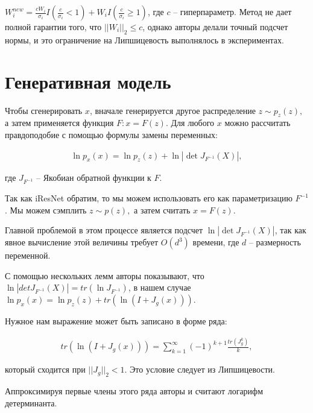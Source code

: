 \documentclass{article}
\begin{document}
$W_i^{new} = \frac{cW_i}{\sigma_i} I(\frac{c}{\sigma_i}<1) + W_i I(\frac{c}{\sigma_i}\geq1)$, где $c$ -- гиперпараметр. Метод не дает полной гарантии того, что $||W_i||_2 \leq c$, однако авторы делали точный подсчет нормы, и это ограничение на Липшицевость выполнялось в экспериментах. 

\section{Генеративная модель}

Чтобы сгенерировать $x$, вначале генерируется другое распределение $z \sim p_z(z),$ а затем применяется функция $F: x = F(z)$. Для любого $x$ можно рассчитать правдоподобие с помощью формулы замены переменных:

\begin{equation*}
\begin{aligned}
    \ln p_x(x) = \ln p_z(z) + \ln |\det J_{F^{-1}}(X)|,
\end{aligned}
\end{equation*}

где $J_{F^{-1}}$ -- Якобиан обратной функции к $F$.

Так как iResNet обратим, то мы можем использовать его как параметризацию $F^{-1}$. Мы можем сэмплить $z \sim p(z),$ а затем считать $x = F(z).$ 

Главной проблемой в этом процессе является подсчет $\ln |\det J_{F^{-1}}(X)|$, так как явное вычисление этой величины требует $O(d^3)$ времени, где $d$ -- размерность переменной.

С помощью нескольких лемм авторы показывают, что 
$\ln |det J_{F^{-1}}(X)| = tr(\ln J_{F^{-1}})$, в нашем случае $\ln p_x(x) = \ln p_z(z) + tr (\ln (I + J_g(x))). $ 

Нужное нам выражение может быть записано в форме ряда:

\begin{equation*}
\begin{aligned}
    tr (\ln (I + J_g (x))) = \sum_{k=1}^\infty (-1)^{k+1} \frac{tr(J_g^k)}{k},
\end{aligned}
\end{equation*}

который сходится при $||J_g||_2 < 1$. Это условие следует из Липшицевости. 

Аппроксимируя первые члены этого ряда авторы и считают логарифм детерминанта. 
\end{document}
